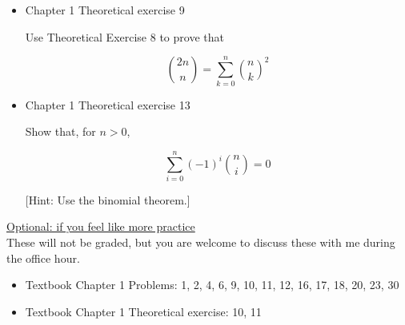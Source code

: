 \documentclass[11pt]{article}
\begin{document}
\begin{itemize}
    \item
    Chapter 1 Theoretical exercise 9
    
    Use Theoretical Exercise 8 to prove that
    
    $$
    {2n \choose n} = \sum_{k=0}^n {n \choose k}^2
    $$
    
    \item
    Chapter 1 Theoretical exercise 13
    
    Show that, for $n > 0$,
    
    $$
    \sum_{i=0}^n (-1)^i {n \choose i} = 0
    $$
    
    [Hint: Use the binomial theorem.]


\end{itemize}

\vspace{12pt}

\underline{Optional: if you feel like more practice}\\
These will not be graded, but you are welcome to discuss these with me during the office hour. 

\begin{itemize}


\item Textbook  Chapter 1 Problems: 1, 2, 4, 6, 9, 10, 11, 12, 16, 17, 18, 20, 23, 30
\item Textbook  Chapter 1 Theoretical exercise: 10, 11



\end{itemize}
\end{document}
